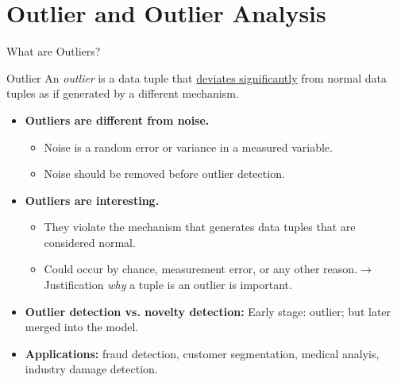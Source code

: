 \section{Outlier and Outlier Analysis}


\begin{frame}{What are Outliers?}
	\begin{block}{Outlier}
		An \textit{outlier} is a data tuple that \underline{deviates significantly} from normal data tuples as if generated by a different mechanism.
	\end{block}

	\begin{itemize}
		\item \textbf{Outliers are different from noise.}
		      \begin{itemize}
			      \item Noise is a random error or variance in a measured variable.
			      \item Noise should be removed before outlier detection.
		      \end{itemize}
		\item \textbf{Outliers are interesting.}
		      \begin{itemize}
			      \item They violate the mechanism that generates data tuples that are considered normal.
			      \item Could occur by chance, measurement error, or any other reason.\newline $\rightarrow$ Justification \textit{why} a tuple is an outlier is important.
		      \end{itemize}
		\item \textbf{Outlier detection vs. novelty detection:} Early stage: outlier; but later merged into the model.
		\item \textbf{Applications:} fraud detection, customer segmentation, medical analyis, industry damage detection.
	\end{itemize}

\end{frame}

